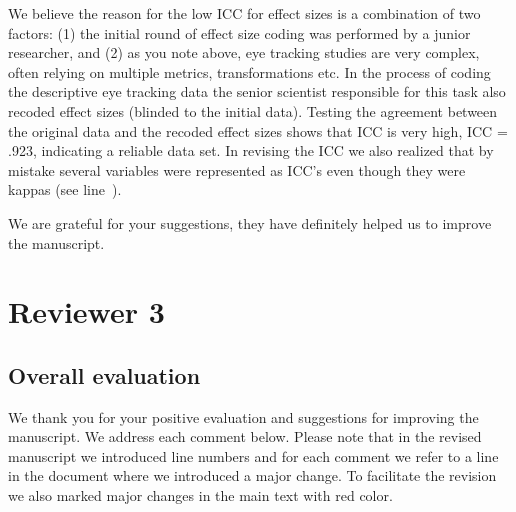 We believe the reason for the low ICC for effect sizes is a combination of two factors: (1) the initial round of effect size coding was performed by a junior researcher, and (2) as you note above, eye tracking studies are very complex, often relying on multiple metrics, transformations etc. In the process of coding the descriptive eye tracking data the senior scientist responsible for this task also recoded effect sizes (blinded to the initial data). Testing the agreement between the original data and the recoded effect sizes shows that ICC is very high, ICC = .923, indicating a reliable data set. In revising the ICC we also realized that by mistake several variables were represented as ICC's even though they were kappas (see line~).



We are grateful for your suggestions, they have definitely helped us to improve the manuscript.




\section{Reviewer 3}
\label{rev:r3}

\subsection{Overall evaluation}
\label{rev:r3sum}


We thank you for your positive evaluation and suggestions for improving the manuscript. We address each comment below. Please note that in the revised manuscript we introduced line numbers and for each comment we refer to a line in the document where we introduced a major change. To facilitate the revision we also marked major changes in the main text with red color.


